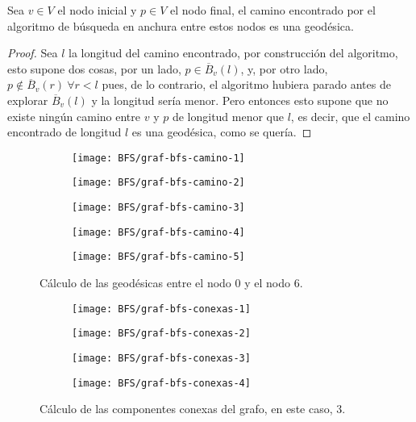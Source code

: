 \begin{proposicion}\label{prop:BFS}
	Sea $v \in V$ el nodo inicial y $p \in V$ el nodo final, el camino encontrado por el algoritmo de búsqueda en anchura entre estos nodos es una geodésica.
\end{proposicion}

\begin{proof}
	Sea $l$ la longitud del camino encontrado, por construcción del algoritmo, esto supone dos cosas, por un lado, $p \in \overline B_v(l)$, y, por otro lado, $p \notin \overline B_v(r)\ \forall r<l$ pues, de lo contrario, el algoritmo hubiera parado antes de explorar $\overline B_v(l)$ y la longitud sería menor. Pero entonces esto supone que no existe ningún camino entre $v$ y $p$ de longitud menor que $l$, es decir, que el camino encontrado de longitud $l$ es una geodésica, como se quería.
\end{proof}


\begin{figure}[htb]
	\centering
	\begin{subfigure}{0.25\linewidth}
		\texttt{[image: BFS/graf-bfs-camino-1]}
		\caption{}
	\end{subfigure}
	\begin{subfigure}{0.25\linewidth}
		\texttt{[image: BFS/graf-bfs-camino-2]}
		\caption{}
	\end{subfigure}
	\begin{subfigure}{0.25\linewidth}
		\texttt{[image: BFS/graf-bfs-camino-3]}
		\caption{}
	\end{subfigure}
	\begin{subfigure}{0.25\linewidth}
		\texttt{[image: BFS/graf-bfs-camino-4]}
		\caption{}
	\end{subfigure}
	\begin{subfigure}{0.25\linewidth}
		\texttt{[image: BFS/graf-bfs-camino-5]}
		\caption{}
	\end{subfigure}
	\caption{Cálculo de las geodésicas entre el nodo $0$ y el nodo $6$.}
	\label{fig:bfs-camino}
\end{figure}

\begin{figure}[!]
	\centering
	\begin{subfigure}{0.25\linewidth}
		\texttt{[image: BFS/graf-bfs-conexas-1]}
		\caption{}
	\end{subfigure}
	\begin{subfigure}{0.25\linewidth}
		\texttt{[image: BFS/graf-bfs-conexas-2]}
		\caption{}
	\end{subfigure}
	\begin{subfigure}{0.25\linewidth}
		\texttt{[image: BFS/graf-bfs-conexas-3]}
		\caption{}
	\end{subfigure}
	\begin{subfigure}{0.25\linewidth}
		\texttt{[image: BFS/graf-bfs-conexas-4]}
		\caption{}
	\end{subfigure}
	\caption{Cálculo de las componentes conexas del grafo, en este caso, 3.}
	\label{fig:bfs-conexas}
\end{figure}


